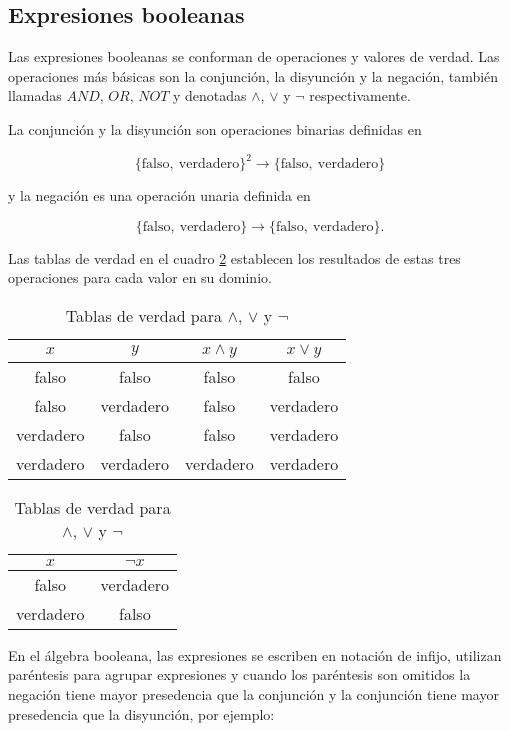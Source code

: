 \subsection{Expresiones booleanas}

Las expresiones booleanas se conforman de operaciones y valores de verdad. Las operaciones más básicas son la conjunción, la disyunción y la negación, también llamadas \( AND \), \( OR \), \( NOT \) y denotadas \( \land \), \( \lor \) y \( \lnot \) respectivamente.

La conjunción y la disyunción son operaciones binarias definidas en

\[ \{ \mathrm{falso},\ \mathrm{verdadero} \}^{2} \to \{ \mathrm{falso},\ \mathrm{verdadero} \} \]

y la negación es una operación unaria definida en

\[ \{ \mathrm{falso},\ \mathrm{verdadero} \} \to \{ \mathrm{falso},\ \mathrm{verdadero} \}. \]

Las tablas de verdad en el cuadro \ref{tab:and-or-not} establecen los resultados de estas tres operaciones para cada valor en su dominio.

\begin{table}[!htbp]
  \centering
  \small
  \begin{tabular}{|c|c|c|c|}
    \hline
    \( x \) & \( y \) & \( x \land y \) & \( x \lor y \) \\ [0.5ex]
    \hline\hline
    falso & falso & falso & falso \\
    falso & verdadero & falso & verdadero \\
    verdadero & falso & falso & verdadero \\
    verdadero & verdadero & verdadero & verdadero \\
    \hline
  \end{tabular}
  \hfill
  \begin{tabular}{|c|c|}
    \hline
    \( x \) & \( \lnot x \) \\ [0.5ex]
    \hline\hline
    falso & verdadero  \\
    verdadero & falso \\
    \hline
  \end{tabular}
  \caption{Tablas de verdad para \( \land \), \( \lor \) y \( \lnot \)}
  \label{tab:and-or-not}
\end{table}

En el álgebra booleana, las expresiones se escriben en notación de infijo, utilizan paréntesis para agrupar expresiones y cuando los paréntesis son omitidos la negación tiene mayor presedencia que la conjunción y la conjunción tiene mayor presedencia que la disyunción, por ejemplo:


